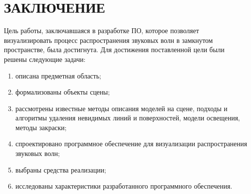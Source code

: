 \chapter*{ЗАКЛЮЧЕНИЕ}

Цель работы, заключавшаяся в разработке ПО, которое позволяет визуализировать процесс распространения звуковых волн в замкнутом пространстве, была достигнута.
Для достижения поставленной цели были решены следующие задачи:
\begin{enumerate}
	\item описана предметная область;
	\item формализованы объекты сцены;
	\item рассмотрены известные методы описания моделей на сцене, подходы и алгоритмы удаления невидимых линий и поверхностей, модели освещения, методы закраски;
	\item спроектировано программное обеспечение для визуализации распространения звуковых волн;
	\item выбраны средства реализации;
	\item исследованы характеристики разработанного программного обеспечения.
\end{enumerate}